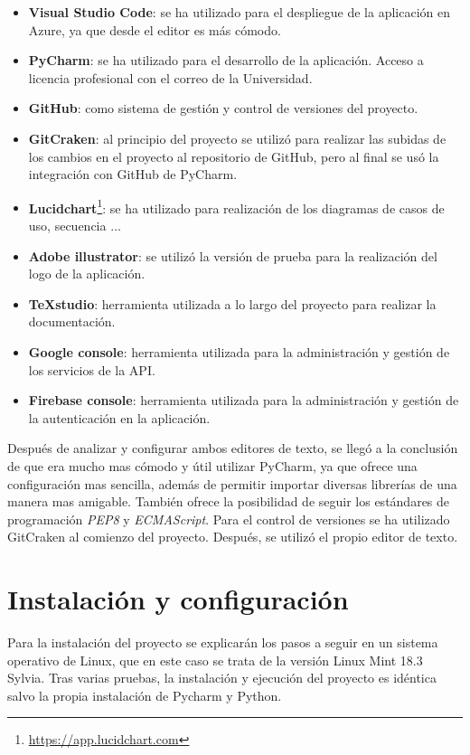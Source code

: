 \begin{itemize}
	\item \textbf{Visual Studio Code}: se ha utilizado para el despliegue de la aplicación en Azure, ya que desde el editor es más cómodo.
	\item \textbf{PyCharm}: se ha utilizado para el desarrollo de la aplicación. Acceso a licencia profesional con el correo de la Universidad.
	\item \textbf{GitHub}: como sistema de gestión y control de versiones del proyecto.
	\item \textbf{GitCraken}: al principio del proyecto se utilizó para realizar las subidas de los cambios en el proyecto al repositorio de GitHub, pero al final se usó la integración con GitHub de PyCharm.
	\item \textbf{Lucidchart}\footnote{\url{https://app.lucidchart.com}}: se ha utilizado para realización de los diagramas de casos de uso, secuencia $\dots$
	\item \textbf{Adobe illustrator}: se utilizó la versión de prueba para la realización del logo de la aplicación.
	\item \textbf{TeXstudio}: herramienta utilizada a lo largo del proyecto para realizar la documentación.
	\item \textbf{Google console}: herramienta utilizada para la administración y gestión de los servicios de la API.
	\item \textbf{Firebase console}: herramienta utilizada para la administración y gestión de la autenticación en la aplicación.
\end{itemize}
Después de analizar y configurar ambos editores de texto, se llegó a la conclusión de que era mucho mas cómodo y útil utilizar PyCharm, ya que ofrece una configuración mas sencilla, además de permitir importar diversas librerías de una manera mas amigable. También ofrece la posibilidad de seguir los estándares de programación \textit{PEP8} y \textit{ECMAScript}.
Para el control de versiones se ha utilizado GitCraken al comienzo del proyecto. Después, se utilizó el propio editor de texto.


\section{Instalación y configuración}
Para la instalación del proyecto se explicarán los pasos a seguir en un sistema operativo de Linux, que en este caso se trata de la versión Linux Mint 18.3 Sylvia.
Tras varias pruebas, la instalación y ejecución del proyecto es idéntica salvo la propia instalación de Pycharm y Python.

